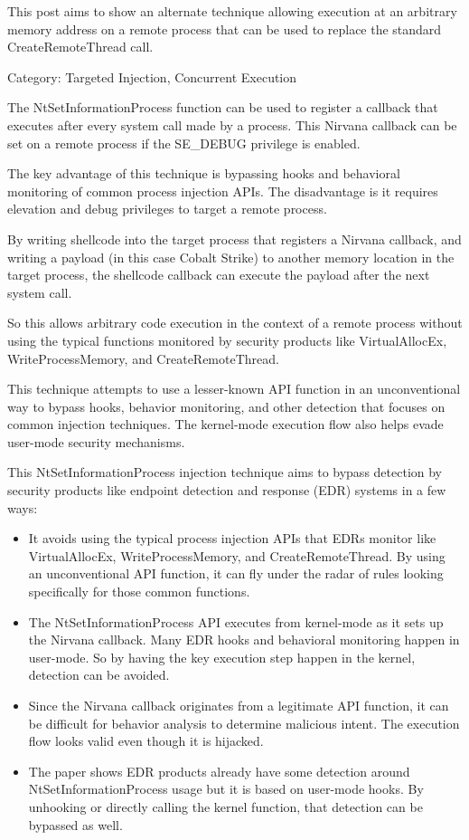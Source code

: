 \documentclass{article}
\begin{document}
This post aims to show an alternate technique allowing execution at an arbitrary memory address on a remote process that can be used to replace the standard CreateRemoteThread call.

Category: Targeted Injection, Concurrent Execution

The NtSetInformationProcess function can be used to register a callback that executes after every system call made by a process. This Nirvana callback can be set on a remote process if the SE\_DEBUG privilege is enabled.

The key advantage of this technique is bypassing hooks and behavioral monitoring of common process injection APIs. The disadvantage is it requires elevation and debug privileges to target a remote process.

By writing shellcode into the target process that registers a Nirvana callback, and writing a payload (in this case Cobalt Strike) to another memory location in the target process, the shellcode callback can execute the payload after the next system call.

So this allows arbitrary code execution in the context of a remote process without using the typical functions monitored by security products like VirtualAllocEx, WriteProcessMemory, and CreateRemoteThread.

This technique attempts to use a lesser-known API function in an unconventional way to bypass hooks, behavior monitoring, and other detection that focuses on common injection techniques. The kernel-mode execution flow also helps evade user-mode security mechanisms.

This NtSetInformationProcess injection technique aims to bypass detection by security products like endpoint detection and response (EDR) systems in a few ways:

\begin{itemize}
\item It avoids using the typical process injection APIs that EDRs monitor like VirtualAllocEx, WriteProcessMemory, and CreateRemoteThread. By using an unconventional API function, it can fly under the radar of rules looking specifically for those common functions.
\item The NtSetInformationProcess API executes from kernel-mode as it sets up the Nirvana callback. Many EDR hooks and behavioral monitoring happen in user-mode. So by having the key execution step happen in the kernel, detection can be avoided.
\item Since the Nirvana callback originates from a legitimate API function, it can be difficult for behavior analysis to determine malicious intent. The execution flow looks valid even though it is hijacked.
\item The paper shows EDR products already have some detection around NtSetInformationProcess usage but it is based on user-mode hooks. By unhooking or directly calling the kernel function, that detection can be bypassed as well.
\end{itemize}
\end{document}
